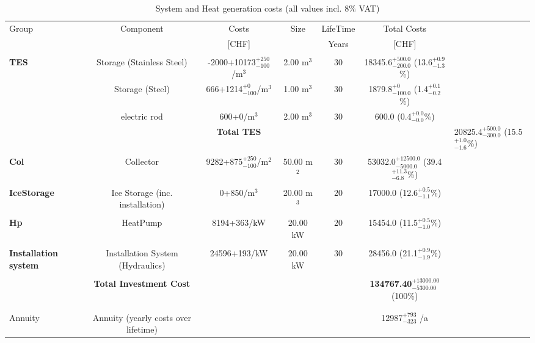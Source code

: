 \documentclass[english]{SPFShortReport}
\begin{document}
\begin{table}[!ht]
\centering
\caption{System and Heat generation costs (all values incl. 8$\%$ VAT) }
\begin{adjustbox}{max width =\textwidth}
\begin{tabular}{l | c c c c c } 
\hline
\hline
Group &Component &Costs &Size &LifeTime &Total Costs \\ 
 & &[CHF] & &Years &[CHF]\\ 
\hline
\\
\textbf{TES} & Storage (Stainless Steel) & -2000+10173$^{\mathrm{+250}}_{\mathrm{-100}}$/m$^3$ & 2.00 m$^3$ & 30 & 18345.6$^{\mathrm{+500.0}}_{\mathrm{-200.0}}$ (13.6$^{\mathrm{+0.9}}_{\mathrm{-1.3}}$\%) \\
 & Storage (Steel) & 666+1214$^{\mathrm{+0}}_{\mathrm{-100}}$/m$^3$ & 1.00 m$^3$ & 30 & 1879.8$^{\mathrm{+0}}_{\mathrm{-100.0}}$ (1.4$^{\mathrm{+0.1}}_{\mathrm{-0.2}}$\%) \\
 & electric rod & 600+0/m$^3$ & 2.00 m$^3$ & 30 & 600.0 (0.4$^{\mathrm{+0.0}}_{\mathrm{-0.0}}$\%) \\
&
 & \textbf{Total TES} & & & & 20825.4$^{\mathrm{+500.0}}_{\mathrm{-300.0}}$ (15.5$^{\mathrm{+1.0}}_{\mathrm{-1.6}}$\%) \\
\hline \\
\textbf{Col} & Collector & 9282+875$^{\mathrm{+250}}_{\mathrm{-100}}$/m$^2$ & 50.00 m$^2$ & 30 & 53032.0$^{\mathrm{+12500.0}}_{\mathrm{-5000.0}}$ (39.4$^{\mathrm{+11.3}}_{\mathrm{-6.8}}$\%) \\
\hline \\
\textbf{IceStorage} & Ice Storage (inc. installation) & 0+850/m$^3$ & 20.00 m$^3$ & 20 & 17000.0 (12.6$^{\mathrm{+0.5}}_{\mathrm{-1.1}}$\%) \\
\hline \\
\textbf{Hp} & HeatPump & 8194+363/kW & 20.00 kW & 20 & 15454.0 (11.5$^{\mathrm{+0.5}}_{\mathrm{-1.0}}$\%) \\
\hline \\
\textbf{Installation system} & Installation System (Hydraulics) & 24596+193/kW & 20.00 kW & 30 & 28456.0 (21.1$^{\mathrm{+0.9}}_{\mathrm{-1.9}}$\%) \\
\hline \\
 & \textbf{Total Investment Cost} & & & & \textbf{134767.40$^{\mathrm{+13000.00}}_{\mathrm{-5300.00}}$} (100\%) \\ 
\hline \\ 
\hline \\ 
Annuity & Annuity (yearly costs over lifetime)  &&& & 12987$^{\mathrm{+793}}_{\mathrm{-323}}$ /a  \\

\end{tabular}
\end{adjustbox}
\end{table}
\end{document}
